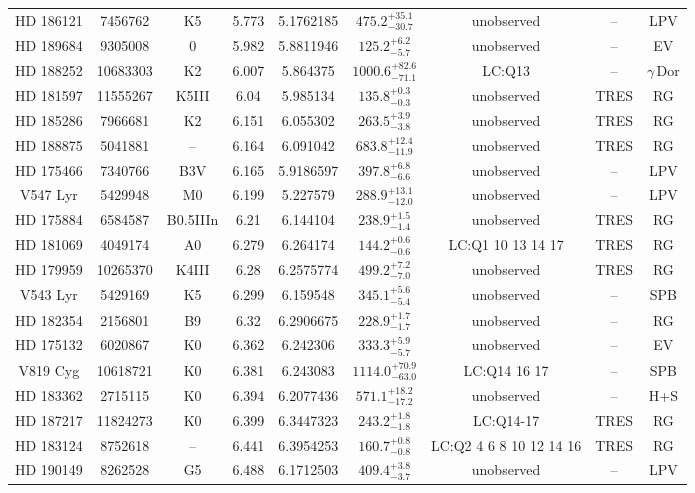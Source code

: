 \begin{table*}
\begin{tabular}{ccccccccc}
HD 186121 & 7456762 & K5 & 5.773 & 5.1762185 & $475.2^{+35.1}_{-30.7}$ & unobserved & -- & LPV \\
HD 189684 & 9305008 & 0 & 5.982 & 5.8811946 & $125.2^{+6.2}_{-5.7}$ & unobserved & -- & EV \\
HD 188252 & 10683303 & K2 & 6.007 & 5.864375 & $1000.6^{+82.6}_{-71.1}$ & LC:Q13 & -- & $\gamma\,\text{Dor}$ \\
HD 181597 & 11555267 & K5III & 6.04 & 5.985134 & $135.8^{+0.3}_{-0.3}$ & unobserved & TRES & RG \\
HD 185286 & 7966681 & K2 & 6.151 & 6.055302 & $263.5^{+3.9}_{-3.8}$ & unobserved & TRES & RG \\
HD 188875 & 5041881 & -- & 6.164 & 6.091042 & $683.8^{+12.4}_{-11.9}$ & unobserved & TRES & RG \\
HD 175466 & 7340766 & B3V & 6.165 & 5.9186597 & $397.8^{+6.8}_{-6.6}$ & unobserved & -- & LPV \\
V547 Lyr & 5429948 & M0 & 6.199 & 5.227579 & $288.9^{+13.1}_{-12.0}$ & unobserved & -- & LPV \\
HD 175884 & 6584587 & B0.5IIIn & 6.21 & 6.144104 & $238.9^{+1.5}_{-1.4}$ & unobserved & TRES & RG \\
HD 181069 & 4049174 & A0 & 6.279 & 6.264174 & $144.2^{+0.6}_{-0.6}$ & LC:Q1 10 13 14 17 & TRES & RG \\
HD 179959 & 10265370 & K4III & 6.28 & 6.2575774 & $499.2^{+7.2}_{-7.0}$ & unobserved & TRES & RG \\
V543 Lyr & 5429169 & K5 & 6.299 & 6.159548 & $345.1^{+5.6}_{-5.4}$ & unobserved & -- & SPB \\
HD 182354 & 2156801 & B9 & 6.32 & 6.2906675 & $228.9^{+1.7}_{-1.7}$ & unobserved & -- & RG \\
HD 175132 & 6020867 & K0 & 6.362 & 6.242306 & $333.3^{+5.9}_{-5.7}$ & unobserved & -- & EV \\
V819 Cyg & 10618721 & K0 & 6.381 & 6.243083 & $1114.0^{+70.9}_{-63.0}$ & LC:Q14 16 17 & -- & SPB \\
HD 183362 & 2715115 & K0 & 6.394 & 6.2077436 & $571.1^{+18.2}_{-17.2}$ & unobserved & -- & H+S \\
HD 187217 & 11824273 & K0 & 6.399 & 6.3447323 & $243.2^{+1.8}_{-1.8}$ & LC:Q14-17 & TRES & RG \\
HD 183124 & 8752618 & -- & 6.441 & 6.3954253 & $160.7^{+0.8}_{-0.8}$ & LC:Q2 4 6 8 10 12 14 16 & TRES & RG \\
HD 190149 & 8262528 & G5 & 6.488 & 6.1712503 & $409.4^{+3.8}_{-3.7}$ & unobserved & -- & LPV \\

\end{tabular}
\end{table*}
